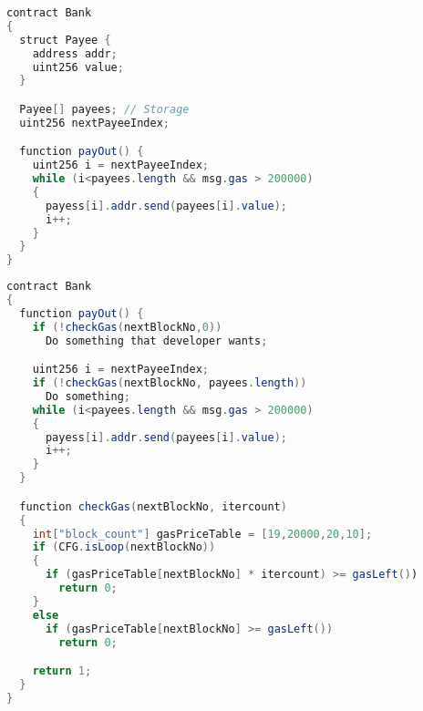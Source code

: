 \documentclass{article}
\begin{document}
\begin{lstlisting}[language=Java, frame=single, caption={Problematic Contract}, captionpos = b]
contract Bank
{
  struct Payee {
    address addr;
    uint256 value;
  }

  Payee[] payees; // Storage
  uint256 nextPayeeIndex;

  function payOut() {
    uint256 i = nextPayeeIndex;
    while (i<payees.length && msg.gas > 200000)
    {
      payess[i].addr.send(payees[i].value);
      i++;
    }
  }
}
\end{lstlisting}

\newpage

\begin{lstlisting}[language=Java, frame=single, caption={Instrumented Contract}, captionpos = b]
contract Bank
{
  function payOut() {
    if (!checkGas(nextBlockNo,0))
      Do something that developer wants;

    uint256 i = nextPayeeIndex;
    if (!checkGas(nextBlockNo, payees.length))
      Do something;
    while (i<payees.length && msg.gas > 200000)
    {      
      payess[i].addr.send(payees[i].value);
      i++;
    }
  }

  function checkGas(nextBlockNo, itercount)
  {
    int["block_count"] gasPriceTable = [19,20000,20,10];
    if (CFG.isLoop(nextBlockNo))
    {
      if (gasPriceTable[nextBlockNo] * itercount) >= gasLeft())
        return 0;
    }
    else
      if (gasPriceTable[nextBlockNo] >= gasLeft())
        return 0;

    return 1;
  }
}
\end{lstlisting}
\end{document}
